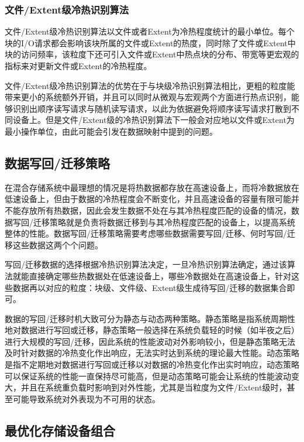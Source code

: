 \subsubsection{文件/Extent级冷热识别算法}

文件/Extent级冷热识别算法以文件或者Extent为冷热程度统计的最小单位。每个块的I/O请求都会影响该块所属的文件或Extent的热度，同时除了文件或Extent中块的访问频率，该粒度下还可引入文件或Extent中热点块的分布、带宽等更宏观的指标来对更新文件或Extent的冷热程度。

文件/Extent级冷热识别算法的优势在于与块级冷热识别算法相比，更粗的粒度能带来更小的系统额外开销，并且可以同时从微观与宏观两个方面进行热点识别，能够识别出顺序读写请求与随机读写请求，以此为依据避免将顺序读写请求打散到不同设备上。但是文件/Extent级的冷热识别算法下一般会对应地以文件或Extent为最小操作单位，由此可能会引发在数据映射中提到的问题。

\subsection{数据写回/迁移策略}

在混合存储系统中最理想的情况是将热数据都存放在高速设备上，而将冷数据放在低速设备上，但由于数据的冷热程度会不断变化，并且高速设备的容量有限可能并不能存放所有热数据，因此会发生数据不处在与其冷热程度匹配的设备的情况，数据写回/迁移策略就是负责将数据迁移到与其冷热程度匹配的设备上，以提高系统整体的性能。数据写回/迁移策略需要考虑哪些数据需要写回/迁移、何时写回/迁移这些数据这两个个问题。

写回/迁移数据的选择根据冷热识别算法决定，一旦冷热识别算法确定，通过该算法就能直接确定哪些热数据处在低速设备上，哪些冷数据处在高速设备上，针对这些数据再以对应的粒度：块级、文件级、Extent级生成待写回/迁移的数据集合即可。

数据的写回/迁移时机大致可分为静态与动态两种策略。静态策略是指系统周期性地对数据进行写回或迁移，静态策略一般选择在系统负载轻的时候（如半夜之后）进行大规模的写回/迁移，因此系统的性能波动对外影响较小，但是静态策略无法及时针对数据的冷热变化作出响应，无法实时达到系统的理论最大性能。动态策略是指不定期地对数据进行写回或迁移以对数据的冷热变化作出实时响应，动态策略可以保证系统的性能一直保持尽可能高，但是动态策略可能会让系统的性能波动变大，并且在系统重负载时影响到对外性能，尤其是当粒度为文件/Extent级时，甚至可能导致系统对外表现为不可用的状态。

\subsection{最优化存储设备组合}

